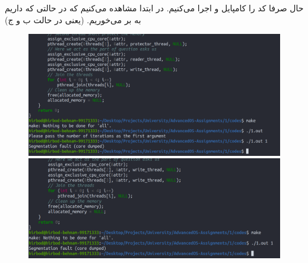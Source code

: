 حال صرفا کد را کامپایل و اجرا می‌کنیم. در ابتدا مشاهده می‌کنیم که در حالتی که
داریم به
بر می‌خوریم.
(یعنی در حالت ب و ج)
\begin{figure}[H]
    \centering
    \includegraphics[scale=0.3]{pics/segfault1.png}
    \includegraphics[scale=0.3]{pics/segfault2.png}
\end{figure}

